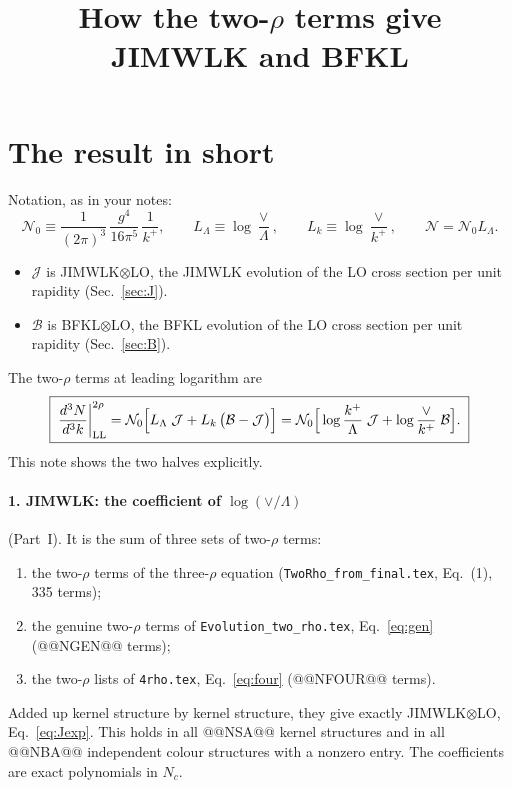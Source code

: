\documentclass[10pt]{article}
\title{How the two-$\rho$ terms give JIMWLK and BFKL}
\date{}
\numberwithin{equation}{section}
\newcommand{\NN}{\mathcal N}
\newcommand{\NO}{\mathcal N_0}
\newcommand{\LL}{L_\Lambda}
\newcommand{\Lk}{L_k}
\newcommand{\J}{\mathcal J}
\newcommand{\B}{\mathcal B}
\begin{document}
\maketitle
\tableofcontents

\section{The result in short}\label{sec:short}
Notation, as in your notes:
\begin{equation}
\NO\equiv\frac{1}{(2\pi)^3}\,\frac{g^4}{16\pi^5}\,\frac1{k^+},\qquad \LL\equiv\log\frac\vee\Lambda,\qquad\Lk\equiv\log\frac\vee{k^+},\qquad \NN=\NO\LL .
\end{equation}
\begin{itemize}
\item $\J$ is JIMWLK$\otimes$LO, the JIMWLK evolution of the LO cross section per unit rapidity (Sec.~\ref{sec:J}).
\item $\B$ is BFKL$\otimes$LO, the BFKL evolution of the LO cross section per unit rapidity (Sec.~\ref{sec:B}).
\end{itemize}
The two-$\rho$ terms at leading logarithm are
\begin{equation}
\boxed{\;\frac{d^3N}{d^3k}\bigg|_{\rm LL}^{2\rho}=\NO\Big[\LL\;\J+\Lk\,\big(\B-\J\big)\Big]=\NO\Big[\log\frac{k^+}{\Lambda}\;\J+\log\frac{\vee}{k^+}\;\B\Big].\;}
\label{eq:result}
\end{equation}
This note shows the two halves explicitly.

\paragraph{1. JIMWLK: the coefficient of $\log(\vee/\Lambda)$} (Part~I). It is the sum of three sets of two-$\rho$ terms:
\begin{enumerate}
\item[(a)] the two-$\rho$ terms of the three-$\rho$ equation (\texttt{TwoRho\_from\_final.tex}, Eq.~(1), 335 terms);
\item[(b)] the genuine two-$\rho$ terms of \texttt{Evolution\_two\_rho.tex}, Eq.~\eqref{eq:gen} (@@NGEN@@ terms);
\item[(c)] the two-$\rho$ lists of \texttt{4rho.tex}, Eq.~\eqref{eq:four} (@@NFOUR@@ terms).
\end{enumerate}
Added up kernel structure by kernel structure, they give exactly JIMWLK$\otimes$LO, Eq.~\eqref{eq:Jexp}. This holds in all @@NSA@@ kernel structures and in all @@NBA@@ independent colour structures with a nonzero entry. The coefficients are exact polynomials in $N_c$.
\end{document}
